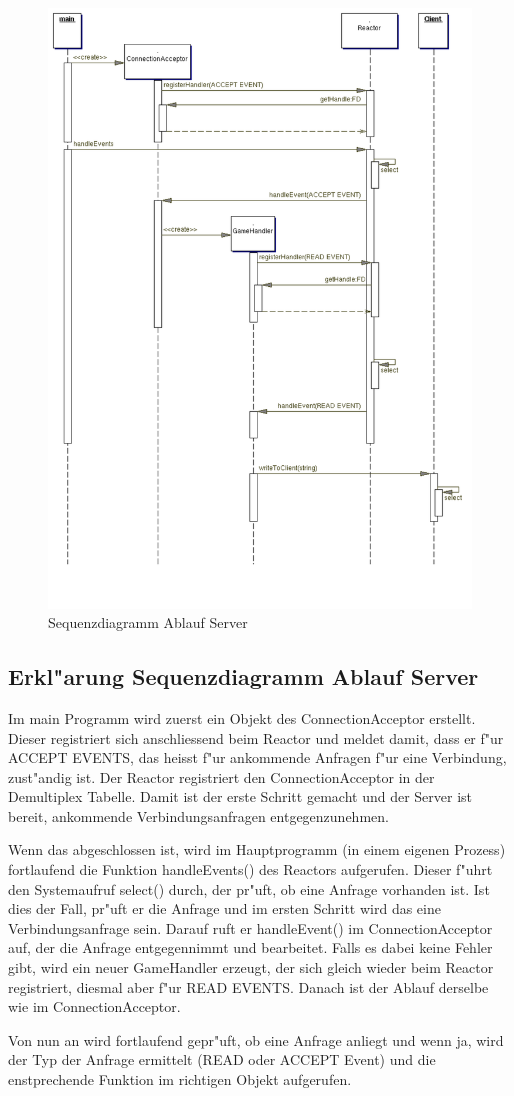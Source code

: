\begin{figure}[H]
  \begin{center}
    \includegraphics[width=12cm]{./images/sequenz_reactor.pdf}
  \end{center}
  \caption{Sequenzdiagramm Ablauf Server}
\end{figure}

\subsection{Erkl"arung Sequenzdiagramm Ablauf Server}
Im main Programm wird zuerst ein Objekt des ConnectionAcceptor erstellt. Dieser registriert sich anschliessend beim Reactor
und meldet damit, dass er f"ur ACCEPT EVENTS, das heisst f"ur ankommende Anfragen f"ur eine Verbindung, zust"andig ist.
Der Reactor registriert den ConnectionAcceptor in der Demultiplex Tabelle. Damit ist der erste Schritt gemacht und der Server
ist bereit, ankommende Verbindungsanfragen entgegenzunehmen.

Wenn das abgeschlossen ist, wird im Hauptprogramm (in einem eigenen Prozess) fortlaufend die Funktion handleEvents() des 
Reactors aufgerufen. Dieser f"uhrt den Systemaufruf select() durch, der pr"uft, ob eine Anfrage vorhanden ist. Ist dies der 
Fall, pr"uft er die Anfrage und im ersten Schritt wird das eine Verbindungsanfrage sein. Darauf ruft er handleEvent() im ConnectionAcceptor
auf, der die Anfrage entgegennimmt und bearbeitet. Falls es dabei keine Fehler gibt, wird ein neuer GameHandler erzeugt, der sich
gleich wieder beim Reactor registriert, diesmal aber f"ur READ EVENTS. Danach ist der Ablauf derselbe wie im ConnectionAcceptor.

Von nun an wird fortlaufend gepr"uft, ob eine Anfrage anliegt und wenn ja, wird der Typ der Anfrage ermittelt (READ oder ACCEPT Event) 
und die enstprechende Funktion im richtigen Objekt aufgerufen.


